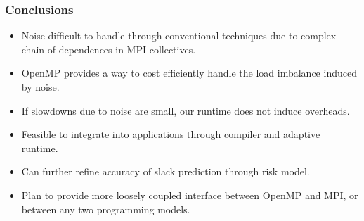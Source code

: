 \begin{frame}
  \frametitle{Conclusions}
  \begin{itemize}
  \item \small Noise difficult to handle through conventional techniques due to complex chain of dependences in MPI collectives.
  \item \small OpenMP provides a way to cost efficiently handle the load imbalance induced by noise.
  \item \small If slowdowns due to noise are small, our runtime does not induce overheads.
  \item \small Feasible to integrate into applications through compiler and adaptive runtime.
  \item \small Can further refine accuracy of slack prediction through risk model.
  \item \small Plan to provide more loosely coupled interface between OpenMP and MPI, or between any two programming models.
  \end{itemize}
\end{frame}
